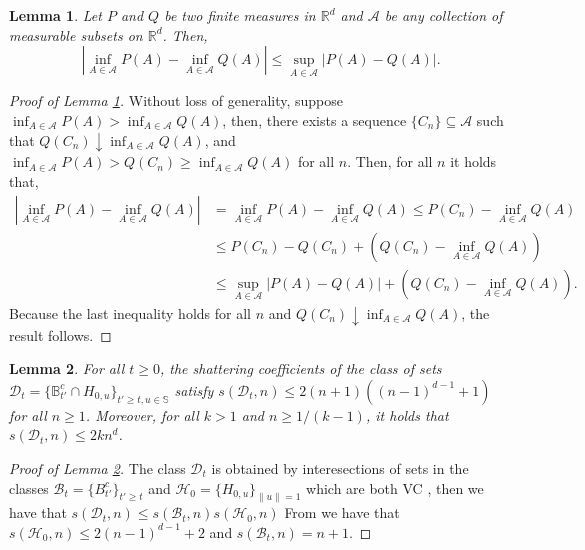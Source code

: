 \documentclass{article}
\numberwithin{equation}{section}
\newtheorem{lemma}{Lemma}[section]
\newcommand{\R}{\mathbb{R}}
\newcommand{\sphere}{\mathbb{S}}
\newcommand{\ball}{\mathbb{B}}
\begin{document}
\begin{lemma}\label{lem:inf_sup_bound}
    Let \(P\) and \(Q\) be two finite measures in \(\R^d\) and
    \(\mathcal{A}\) be any collection
    of measurable subsets on \(\R^d\). Then,
    \begin{equation*}
        \left| \inf_{A\in\mathcal{A}}{P(A)} -
        \inf_{A\in\mathcal{A}}{Q(A)}
        \right|\leq\sup_{A\in\mathcal{A}}\left|P(A)-Q(A)\right|.
    \end{equation*}
\end{lemma}
\begin{proof}[Proof of Lemma \ref{lem:inf_sup_bound}]
    Without loss of generality, suppose
    \(\inf_{A\in\mathcal{A}}{P(A)}>\inf_{A\in\mathcal{A}}{Q(A)}\),
    then, there exists a sequence
    \(\{C_n\}\subseteq\mathcal{A}\) such that \(Q(C_n)\downarrow
    \inf_{A\in\mathcal{A}}{Q(A)}\), and
    \(\inf_{A\in\mathcal{A}}{P(A)}>Q(C_n)\geq\inf_{A\in\mathcal{A}}{Q(A)}\)
    for all \(n\). Then, for all \(n\) it holds
    that,
    \begin{align*}
        \left| \inf_{A\in\mathcal{A}}{P(A)} -
        \inf_{A\in\mathcal{A}}{Q(A)} \right|
        & =\inf_{A\in\mathcal{A}}{P(A)} -
        \inf_{A\in\mathcal{A}}{Q(A)}\leq P(C_n) -
        \inf_{A\in\mathcal{A}}{Q(A)} \\
        & \leq P(C_n) - Q(C_n) +
        \left(Q(C_n)-\inf_{A\in\mathcal{A}}{Q(A)}\right)
        \\
        & \leq \sup_{A\in\mathcal{A}}\left|P(A)-Q(A)\right| +
        \left(Q(C_n)-\inf_{A\in\mathcal{A}}{Q(A)}\right).
    \end{align*}
    Because the last inequality holds for all \(n\) and
    \(Q(C_n)\downarrow \inf_{A\in\mathcal{A}}{Q(A)}\), the result follows.
\end{proof}

\begin{lemma}\label{lem:shattering_coef} For all \(t\geq 0\), the
    shattering coefficients of the class of sets
    \(\mathcal{D}_t=\{\ball_{t'}^c\cap H_{0,u}\}_{t'\geq t, u\in\sphere}\)
    satisfy \(s(\mathcal{D}_t, n)\leq 2(n+1)((n-1)^{d-1}+1)\) for all
    \(n\geq 1\). Moreover, for all \(k>1\) and \(n\geq 1/(k-1)\), it
    holds that \(s(\mathcal{D}_t,n)\leq 2k n^d\).
\end{lemma}
\begin{proof}[Proof of Lemma \ref{lem:shattering_coef}]
    The class \(\mathcal{D}_t\) is obtained by interesections of sets in the classes  \(\mathcal{B}_t=\{ {B}^c_{t'} \}_{t'\geq t}\) and
    \(\mathcal{H}_0= \{H_{0,u}\}_{\|u\|=1}\)
    which are both VC \cite[Chapter
    13]{devroye2013probabilistic}, then we have that
    \(s(\mathcal{D}_t,n)\leq
    s(\mathcal{B}_t,n)s(\mathcal{H}_0,n) \) \citep[][Theorem 1.12]{lugosi2002pattern}%
    From \cite[Corollary 13.1]{devroye2013probabilistic} we have
    that \(s(\mathcal{H}_{0},n)\leq 2(n-1)^{d-1}+2\)
    and \(s(\mathcal{B}_t,n)=n+1\).
\end{proof}
\end{document}

